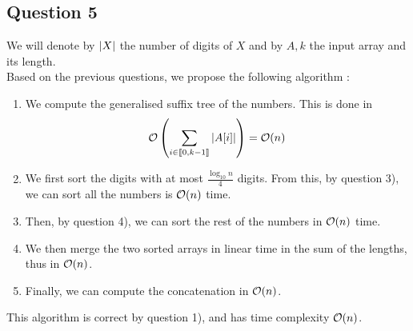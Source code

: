 \documentclass{cours}
\begin{document}
        \subsection{Question 5}
        We will denote by $\left|X\right|$ the number of digits of $X$ and by $A, k$ the input array and its length.\\
        Based on the previous questions, we propose the following algorithm : 
        \begin{enumerate}
            \item We compute the generalised suffix tree of the numbers. This is done in \[\mathcal{O}\left(\sum_{i \in \llbracket 0, k - 1\rrbracket}\left|A[i]\right|\right) = \mathcal{O}(n)\]
            \item We first sort the digits with at most $\frac{\log_{10} n}{4}$ digits.  From this, by question 3), we can sort all the numbers is $\mathcal{O}(n)$ time. 
            \item Then, by question 4), we can sort the rest of the numbers in $\mathcal{O}(n)$ time. 
            \item We then merge the two sorted arrays in linear time in the sum of the lengths, thus in $\mathcal{O}(n)$.
            \item Finally, we can compute the concatenation in $\mathcal{O}(n)$.
        \end{enumerate}
        This algorithm is correct by question 1), and has time complexity $\mathcal{O}(n)$.
\end{document}
